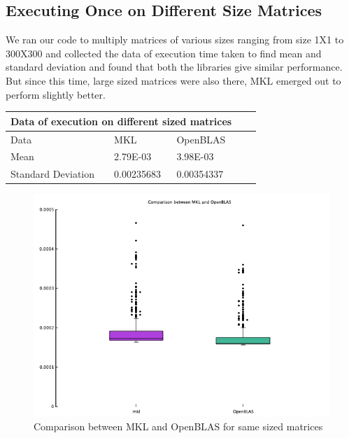 \documentclass{article}
\begin{document}
\subsection{Executing Once on Different Size Matrices}
We ran our code to multiply matrices of various sizes ranging from size 1X1 to 300X300 and collected the data of execution time taken to find mean and standard deviation and found that both the libraries give similar performance. But since this time, large sized matrices were also there, MKL emerged out to perform slightly better.\\
\begin{center}
\begin{tabular}[h]{|l|l|l|l|l|}
\hline
\multicolumn{3}{|c|}{Data of execution on different sized matrices} \\
\hline
Data & MKL & OpenBLAS\\
\hline
Mean & 2.79E-03 & 3.98E-03\\
\hline
Standard Deviation & 0.00235683 & 0.00354337\\
\hline
\end{tabular}
\end{center}

\begin{figure}[h]
\centering
\includegraphics[scale=0.4]{1.png}
\caption{Comparison between MKL and OpenBLAS for same sized matrices}
\label{fig:1.png}
\end{figure}
\end{document}
